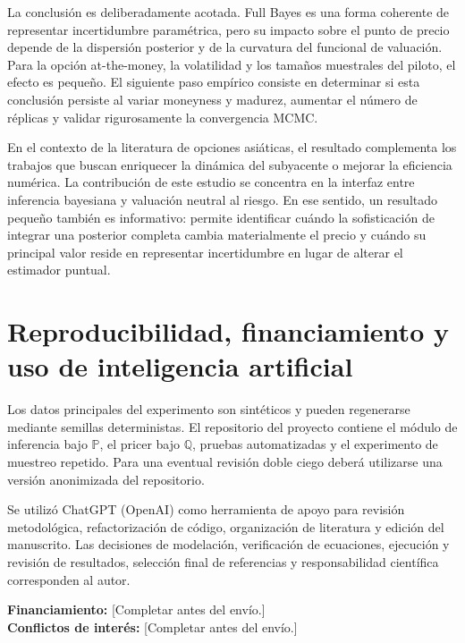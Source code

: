 \documentclass[12pt,letterpaper]{article}
\newcommand{\Pmeasure}{\mathbb{P}}
\newcommand{\Qmeasure}{\mathbb{Q}}
\begin{document}
La conclusión es deliberadamente acotada. Full Bayes es una forma coherente de representar incertidumbre paramétrica, pero su impacto sobre el punto de precio depende de la dispersión posterior y de la curvatura del funcional de valuación. Para la opción at-the-money, la volatilidad y los tamaños muestrales del piloto, el efecto es pequeño. El siguiente paso empírico consiste en determinar si esta conclusión persiste al variar moneyness y madurez, aumentar el número de réplicas y validar rigurosamente la convergencia MCMC.

En el contexto de la literatura de opciones asiáticas, el resultado complementa los trabajos que buscan enriquecer la dinámica del subyacente o mejorar la eficiencia numérica. La contribución de este estudio se concentra en la interfaz entre inferencia bayesiana y valuación neutral al riesgo. En ese sentido, un resultado pequeño también es informativo: permite identificar cuándo la sofisticación de integrar una posterior completa cambia materialmente el precio y cuándo su principal valor reside en representar incertidumbre en lugar de alterar el estimador puntual.

\section*{Reproducibilidad, financiamiento y uso de inteligencia artificial}

Los datos principales del experimento son sintéticos y pueden regenerarse mediante semillas deterministas. El repositorio del proyecto contiene el módulo de inferencia bajo $\Pmeasure$, el pricer bajo $\Qmeasure$, pruebas automatizadas y el experimento de muestreo repetido. Para una eventual revisión doble ciego deberá utilizarse una versión anonimizada del repositorio.

Se utilizó ChatGPT (OpenAI) como herramienta de apoyo para revisión metodológica, refactorización de código, organización de literatura y edición del manuscrito. Las decisiones de modelación, verificación de ecuaciones, ejecución y revisión de resultados, selección final de referencias y responsabilidad científica corresponden al autor.

\textbf{Financiamiento:} [Completar antes del envío.]\\
\textbf{Conflictos de interés:} [Completar antes del envío.]
\end{document}
